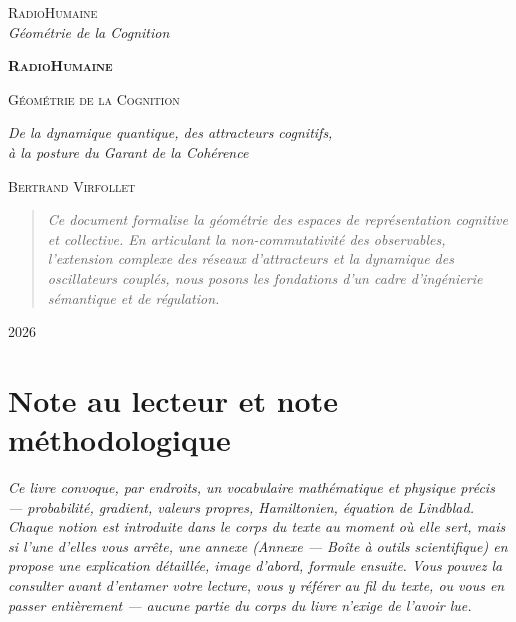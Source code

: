 \documentclass[french, 11pt, twoside, openright, a5paper]{book}
\begin{document}
\frontmatter

\thispagestyle{empty}
\vspace*{3.5cm}
\begin{center}
    {\Huge\scshape RadioHumaine}\\[0.6em]
    {\large\itshape Géométrie de la Cognition}
\end{center}
\cleardoublepage

\thispagestyle{empty}
\begin{center}
    \vspace*{1.5cm}
    {\Huge\bfseries\scshape RadioHumaine\par}
    \vspace{0.4cm}
    {\Large\scshape Géométrie de la Cognition\par}
    \vspace{0.6cm}
    {\large\itshape De la dynamique quantique, des attracteurs cognitifs,\\à la posture du Garant de la Cohérence\par}
    \vspace{2cm}
    {\Large\scshape Bertrand Virfollet\par}
    \vfill
    \begin{quote}
        \small\itshape\centering
        Ce document formalise la géométrie des espaces de représentation cognitive et collective. En articulant la non-commutativité des observables, l'extension complexe des réseaux d'attracteurs et la dynamique des oscillateurs couplés, nous posons les fondations d'un cadre d'ingénierie sémantique et de régulation.
    \end{quote}
    \vfill
    {\small 2026\par}
\end{center}
\cleardoublepage

\tableofcontents
\cleardoublepage

\mainmatter

\cleardoublepage
\chapter*{Note au lecteur et note méthodologique}

\emph{Ce livre convoque, par endroits, un vocabulaire mathématique et physique précis --- probabilité, gradient, valeurs propres, Hamiltonien, équation de Lindblad. Chaque notion est introduite dans le corps du texte au moment où elle sert, mais si l'une d'elles vous arrête, une annexe (\emph{Annexe --- Boîte à outils scientifique}) en propose une explication détaillée, image d'abord, formule ensuite. Vous pouvez la consulter avant d'entamer votre lecture, vous y référer au fil du texte, ou vous en passer entièrement --- aucune partie du corps du livre n'exige de l'avoir lue.}
\end{document}
